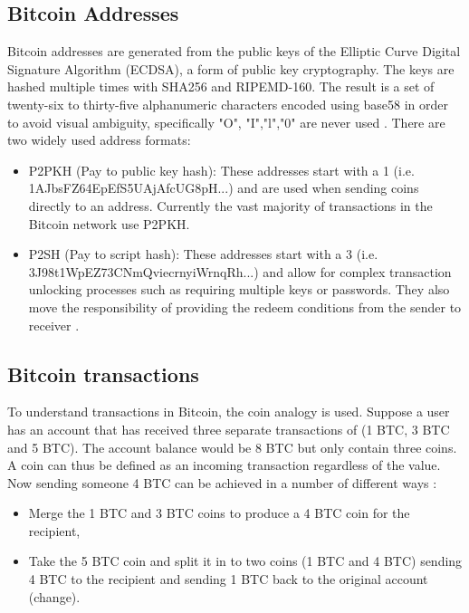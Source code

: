 \documentclass{article}
\begin{document}
\subsection{Bitcoin Addresses}

Bitcoin addresses are generated from the public keys of the Elliptic Curve Digital Signature Algorithm (ECDSA), a form of public key cryptography. The keys are hashed multiple times with SHA256 and RIPEMD-160. The result is a set of twenty-six to thirty-five alphanumeric characters encoded using base58 in order to avoid visual ambiguity, specifically "O", "I","l","0" are never used \cite{antonopoulos2014mastering}. There are two widely used address formats:

\begin{itemize}
  \item P2PKH (Pay to public key hash): These addresses start with a 1 (i.e. 1AJbsFZ64EpEfS5UAjAfcUG8pH...) and are used when sending coins directly to an address. Currently the vast majority of transactions in the Bitcoin network use P2PKH.
  \item P2SH (Pay to script hash): These addresses start with a 3 (i.e. 3J98t1WpEZ73CNmQviecrnyiWrnqRh...) and allow for complex transaction unlocking processes such as requiring multiple keys or passwords. They also move the responsibility of providing the redeem conditions from the sender to receiver \cite{antonopoulos2014mastering}.
\end{itemize}

\subsection{Bitcoin transactions}

To understand transactions in Bitcoin, the coin analogy is used. Suppose a user has an account that has received three separate transactions of (1 BTC, 3 BTC and 5 BTC). The account balance would be 8 BTC but only contain three coins. A coin can thus be defined as an incoming transaction regardless of the value. Now sending someone 4 BTC can be achieved in a number of different ways \cite{antonopoulos2014mastering}:

\begin{itemize}
  \item Merge the 1 BTC and 3 BTC coins to produce a 4 BTC coin for the recipient,
  \item Take the 5 BTC coin and split it in to two coins (1 BTC and 4 BTC) sending 4 BTC to the recipient and sending 1 BTC back to the original account (change).
\end{itemize}
\end{document}
